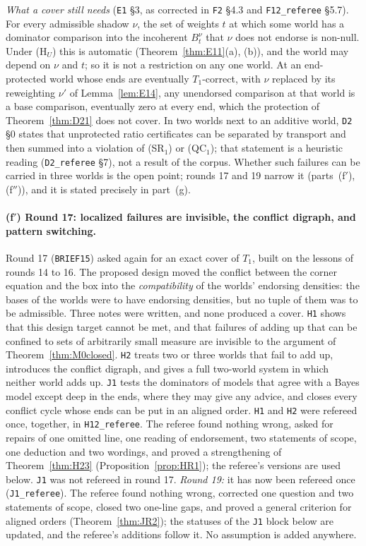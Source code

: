 \documentclass[11pt]{article}
\theoremstyle{definition}
\theoremstyle{remark}
\newcommand{\src}[1]{\texttt{#1}}
\begin{document}
\emph{What a cover still needs} (\src{E1} \S3, as corrected in \src{F2} \S4.3 and \src{F12\_referee} \S5.7). For every admissible shadow $\nu$, the set of weights $t$ at which some world has a dominator comparison into the incoherent $B^\nu_t$ that $\nu$ does not endorse is non-null. Under (H$_U$) this is automatic (Theorem~\ref{thm:E11}(a), (b)), and the world may depend on $\nu$ and $t$; so it is not a restriction on any one world. At an end-protected world whose ends are eventually $T_1$-correct, with $\nu$ replaced by its reweighting $\nu'$ of Lemma~\ref{lem:E14}, any unendorsed comparison at that world is a base comparison, eventually zero at every end, which the protection of Theorem~\ref{thm:D21} does not cover. In two worlds next to an additive world, \src{D2} \S0 states that unprotected ratio certificates can be separated by transport and then summed into a violation of (SR$_1$) or (QC$_1$); that statement is a heuristic reading (\src{D2\_referee} \S7), not a result of the corpus. Whether such failures can be carried in three worlds is the open point; rounds 17 and 19 narrow it (parts~(f$'$), (f$''$)), and it is stated precisely in part~(g).

\paragraph{(f$'$) Round 17: localized failures are invisible, the conflict digraph, and pattern switching.} Round 17 (\src{BRIEF15}) asked again for an exact cover of $T_1$, built on the lessons of rounds 14 to 16. The proposed design moved the conflict between the corner equation and the box into the \emph{compatibility} of the worlds' endorsing densities: the bases of the worlds were to have endorsing densities, but no tuple of them was to be admissible. Three notes were written, and none produced a cover. \src{H1} shows that this design target cannot be met, and that failures of adding up that can be confined to sets of arbitrarily small measure are invisible to the argument of Theorem~\ref{thm:M0closed}. \src{H2} treats two or three worlds that fail to add up, introduces the conflict digraph, and gives a full two-world system in which neither world adds up. \src{J1} tests the dominators of models that agree with a Bayes model except deep in the ends, where they may give any advice, and closes every conflict cycle whose ends can be put in an aligned order. \src{H1} and \src{H2} were refereed once, together, in \src{H12\_referee}. The referee found nothing wrong, asked for repairs of one omitted line, one reading of endorsement, two statements of scope, one deduction and two wordings, and proved a strengthening of Theorem~\ref{thm:H23} (Proposition~\ref{prop:HR1}); the referee's versions are used below. \src{J1} was not refereed in round 17. \emph{Round 19:} it has now been refereed once (\src{J1\_referee}). The referee found nothing wrong, corrected one question and two statements of scope, closed two one-line gaps, and proved a general criterion for aligned orders (Theorem~\ref{thm:JR2}); the statuses of the \src{J1} block below are updated, and the referee's additions follow it. No assumption is added anywhere.
\end{document}
